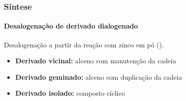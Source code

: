 \begin{frame}
\frametitle{Síntese}
\framesubtitle{Desalogenação de derivado dialogenado}

Desalogenação a partir da reação com zinco em pó ().

\begin{itemize}

\item \textbf{Derivado vicinal:} alceno com manutenção da cadeia
\begin{figure}
\centering
{}
\end{figure}

\item \textbf{Derivado geminado:} alceno com duplicação da cadeia
\begin{figure}
\centering
{}
\end{figure}

\item \textbf{Derivado isolado:} composto cíclico
\begin{figure}
\centering
{}
\end{figure}

\end{itemize}

\end{frame}
